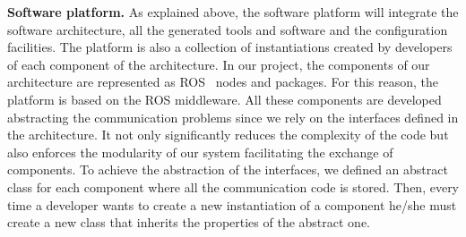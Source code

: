 
\textbf{Software platform.}
As explained above, the software platform will integrate the software architecture, all the generated tools and software and the configuration facilities.
The platform is also a collection of %
instantiations created by developers of each component of the architecture.
In our project, the components of our architecture are represented as ROS~\cite{Quigley2009} nodes and packages.
For this reason, the platform is based on the ROS middleware.
All these components are developed abstracting the communication problems since we rely on the interfaces defined in the architecture.
It not only significantly reduces the complexity of the code but also enforces the modularity of our system facilitating the exchange of components.
To achieve the abstraction of the interfaces, we defined an abstract class for each component where all the communication code is stored.
Then, every time a developer wants to create a new instantiation of a component he/she must create a new class  that inherits the properties of the abstract one.



